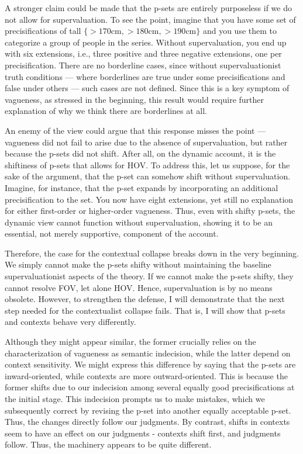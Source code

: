 A stronger claim could be made that the p-sets are entirely purposeless
if we do not allow for supervaluation. To see the point, imagine that
you have some set of precisifications of tall $\{>170\text{cm},
>180\text{cm}, >190\text{cm}\}$ and you use them to categorize a
group of people in the series. Without supervaluation, you end up with
six extensions, i.e., three positive and three negative extensions, one
per precisification. There are no borderline cases, since without
supervaluationist truth conditions --- where borderlines are true under
some precisifications and false under others --- such cases are not
defined. Since this is a key symptom of vagueness, as stressed in the
beginning, this result would require further explanation of why we think
there are borderlines at all.

An enemy of the view could argue that this response misses the point ---
vagueness did not fail to arise due to the absence of supervaluation,
but rather because the p-sets did not shift. After all, on the dynamic
account, it is the shiftiness of p-sets that allows for HOV. To address
this, let us suppose, for the sake of the argument, that the p-set can
somehow shift without supervaluation. Imagine, for instance, that the
p-set expands by incorporating an additional precisification to the set.
You now have eight extensions, yet still no explanation for either
first-order or higher-order vagueness. Thus, even with shifty p-sets,
the dynamic view cannot function without supervaluation, showing it to
be an essential, not merely supportive, component of the account.

Therefore, the case for the contextual collapse breaks down in the very
beginning. We simply cannot make the p-sets shifty without maintaining
the baseline supervaluationist aspects of the theory. If we cannot make
the p-sets shifty, they cannot resolve FOV, let alone HOV. Hence,
supervaluation is by no means obsolete. However, to strengthen the
defense, I will demonstrate that the next step needed for the
contextualist collapse fails. That is, I will show that p-sets and
contexts behave very differently.

Although they might appear similar, the former crucially relies on the
characterization of vagueness as semantic indecision, while the latter
depend on context sensitivity. We might express this difference by
saying that the p-sets are inward-oriented, while contexts are more
outward-oriented. This is because the former shifts due to our
indecision among several equally good precisifications at the initial
stage. This indecision prompts us to make mistakes, which we
subsequently correct by revising the p-set into another equally
acceptable p-set. Thus, the changes directly follow our judgments. By
contrast, shifts in contexts seem to have an effect on our judgments -
contexts shift first, and judgments follow. Thus, the machinery appears
to be quite different.

